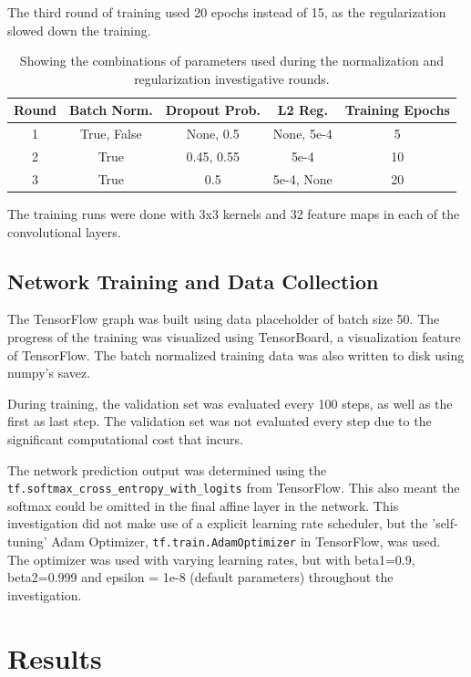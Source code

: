\documentclass[]{article}
\begin{document}
The third round of training used 20 epochs instead of 15, as the regularization slowed down the training.

\begin{table}[h]
	\centering
	\caption{Showing the combinations of parameters used during the normalization and regularization investigative rounds.}
	\label{reg-table}
	\begin{tabular}{@{}ccccc@{}}
		\toprule
		Round & Batch Norm. & Dropout Prob. & L2 Reg. & Training Epochs \\ \midrule
		1 & True, False & None, 0.5 & None, 5e-4 & 5 \\
		2 & True & 0.45, 0.55 & 5e-4 & 10 \\
		3 & True & 0.5 & 5e-4, None & 20 \\ \bottomrule
	\end{tabular}
\end{table}

The training runs were done with 3x3 kernels and 32 feature maps in each of the convolutional layers. 

\subsection{Network Training and Data Collection}

The TensorFlow graph was built using data placeholder of batch size 50. The progress of the training was visualized using TensorBoard, a visualization feature of TensorFlow. The batch normalized training data was also written to disk using numpy's savez. 

During training, the validation set was evaluated every 100 steps, as well as the first as last step. The validation set was not evaluated every step due to the significant computational cost that incurs. 

The network prediction output was determined using the \texttt{tf.softmax\_cross\_entropy\_with\_logits} from TensorFlow.  This also meant the softmax could be omitted in the final affine layer in the network. This investigation did not make use of a explicit learning rate scheduler, but the 'self-tuning' Adam Optimizer, \texttt{tf.train.AdamOptimizer} in TensorFlow, was used. The optimizer was used with varying learning rates, but with beta1=0.9, beta2=0.999 and epsilon = 1e-8 (default parameters) throughout the investigation. 
 
\section{Results}
\end{document}

